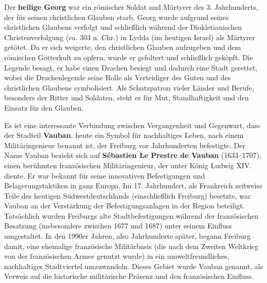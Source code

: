 \documentclass[landscape, a4paper]{article}
\newcommand\alert[1]{\textcolor{PrimaryColor}{\textbf{#1}}}
\begin{document}
\begin{minipage}[t]{0.31\textwidth}
{	Der \alert{heilige Georg} war ein römischer Soldat und Märtyrer des 3. Jahrhunderts, der für seinen christlichen Glauben starb. Georg wurde aufgrund seines christlichen Glaubens verfolgt und schließlich während der Diokletianischen Christenverfolgung (ca. 303 n. Chr.) in Lydda (im heutigen Israel) als Märtyrer getötet. Da er sich weigerte, den christlichen Glauben aufzugeben und dem römischen Götterkult zu opfern, wurde er gefoltert und schließlich geköpft. Die Legende besagt, er habe einen Drachen besiegt und dadurch eine Stadt gerettet, wobei die Drachenlegende seine Rolle als Verteidiger des Guten und des christlichen Glaubens symbolisiert. Als Schutzpatron vieler Länder und Berufe, besonders der Ritter und Soldaten, steht er für Mut, Standhaftigkeit und den Einsatz für den Glauben.

  Es ist eine interessante Verbindung zwischen Vergangenheit und Gegenwart, dass der Stadteil \alert{Vauban}, heute ein Symbol für nachhaltiges Leben, nach einem Militäringenieur benannt ist, der Freiburg vor Jahrhunderten befestigte. Der Name Vauban bezieht sich auf \alert{Sébastien Le Prestre de Vauban} (1633–1707), einen berühmten französischen Militäringenieur, der unter König Ludwig XIV. diente. Er war bekannt für seine innovativen Befestigungen und Belagerungstaktiken in ganz Europa. Im 17. Jahrhundert, als Frankreich zeitweise Teile des heutigen Südwestdeutschlands (einschließlich Freiburg) besetzte, war Vauban an der Verstärkung der Befestigungsanlagen in der Region beteiligt. Tatsächlich wurden Freiburgs alte Stadtbefestigungen während der französischen Besatzung (insbesondere zwischen 1677 und 1687) unter seinem Einfluss umgestaltet. In den 1990er Jahren, also Jahrhunderte später, begann Freiburg damit, eine ehemalige französische Militärbasis (die nach dem Zweiten Weltkrieg von der französischen Armee genutzt wurde) in ein umweltfreundliches, nachhaltiges Stadtviertel umzuwandeln. Dieses Gebiet wurde Vauban genannt, als Verweis auf die historische militärische Präsenz und den französischen Einfluss. 
}
\end{minipage}%
\end{document}
